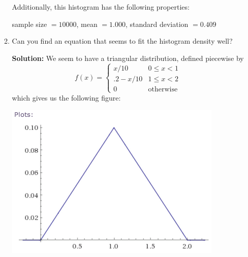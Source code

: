 \documentclass[11pt]{article} %
\begin{document}
\begin{enumerate}
\begin{enumerate}
Additionally, this histogram has the following properties:

sample size $= 10000$,
mean $= 1.000$,
standard deviation $= 0.409$

\item Can you find an equation that seems to fit the histogram density well?

{\bf Solution:} We seem to have a triangular distribution, defined piecewise by 
$$f(x) = \left\{\begin{array}{cc}
x/10 & 0 \le x < 1 \\
.2 - x/10  & 1 \le x < 2\\
0 & \textrm{otherwise}
\end{array}\right.$$
which gives us the following figure:

\includegraphics[scale = .5]{one}

\end{enumerate}

\end{enumerate}
\end{document}
